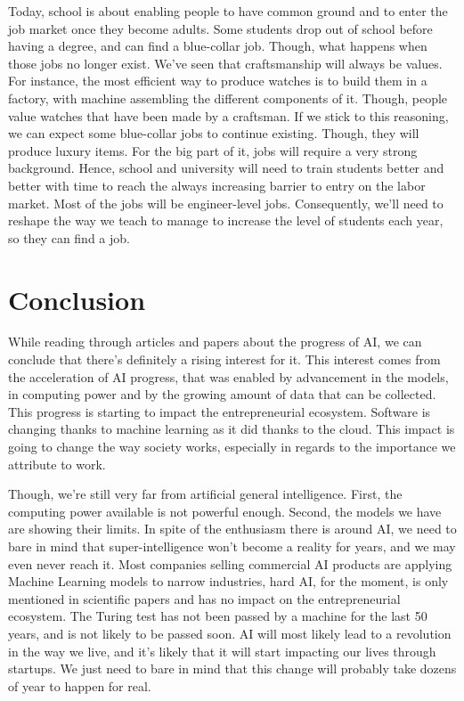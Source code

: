 \documentclass[12pt]{article}
\begin{document}
Today, school is about enabling people to have common ground and to enter the
job market once they become adults. Some students drop out of school before
having a degree, and can find a blue-collar job. Though, what happens when those
jobs no longer exist.
We've seen that craftsmanship will always be values. For instance, the most
efficient way to produce watches is to build them in a factory, with machine
assembling the different components of it. Though, people value watches that have
been made by a craftsman. If we stick to this reasoning, we can expect some
blue-collar jobs to continue existing. Though, they will produce luxury items.
For the big part of it, jobs will require a very strong background. Hence,
school and university will need to train students better and better with time to
reach the always increasing barrier to entry on the labor market. Most of the
jobs will be engineer-level jobs.
Consequently, we'll need to reshape the way we teach to manage to increase the
level of students each year, so they can find a job.

\pagebreak


\section*{Conclusion}\label{conclusion}

While reading through articles and papers about the progress of AI, we can
conclude  that there's definitely a rising interest for it. This interest comes
from the  acceleration of AI progress, that was enabled by advancement in the
models, in  computing power and by the growing amount of data that can be
collected. This  progress is starting to impact the entrepreneurial ecosystem.
Software is  changing thanks to machine learning as it did thanks to the cloud.
This impact is going to change the way society works, especially in regards to
the  importance we attribute to work.

Though, we're still very far from artificial general intelligence. First, the
computing power available is not powerful enough. Second, the models we have
are showing their limits. In spite of the enthusiasm there is around AI, we
need to bare in mind that super-intelligence won't become a reality for years,
and we may even never reach it. Most companies selling commercial AI products
are applying Machine Learning models to narrow industries, hard AI, for the
moment, is only mentioned in scientific papers and has no impact on the
entrepreneurial ecosystem.
The Turing test has not been passed by a machine for the last 50 years,
and is not likely to be passed soon.
AI will most likely
lead to a revolution in the  way we live, and it's likely that it will start
impacting our lives through  startups. We just need to bare in mind that this
change will probably take dozens  of year to happen for real.
\end{document}
